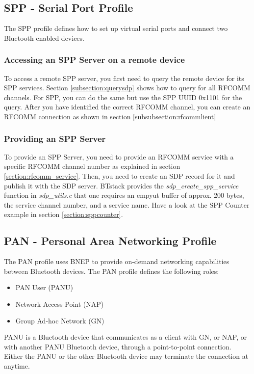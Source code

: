 \subsection{SPP - Serial Port Profile}
The SPP profile defines how to set up virtual serial ports and connect two Bluetooth enabled devices. 

\subsubsection{Accessing an SPP Server on a remote device}
To access a remote SPP server, you first need to query the remote device for its SPP services. Section \ref{subsection:querysdp} shows how to query for all RFCOMM channels. For SPP, you can do the same but use the SPP UUID 0x1101 for the query. After you have identified the correct RFCOMM channel, you can create an RFCOMM connection as shown in section \ref{subsubsection:rfcommlient}

\subsubsection{Providing an SPP Server}
To provide an SPP Server, you need to provide an RFCOMM service with a specific RFCOMM channel number as explained in section \ref{section:rfcomm_service}. Then, you need to create an SDP record for it and publish it with the SDP server. BTstack provides the \emph{sdp\_create\_spp\_service} function in \emph{sdp\_utils.c} that one requires an empyut buffer of approx. 200 bytes, the service channel number, and a service name. Have a look at the SPP Counter example in section \ref{section:sppcounter}.

\subsection{PAN -  Personal Area Networking Profile}
\label{section:pan_profile}
The PAN profile uses BNEP to provide on-demand networking capabilities between Bluetooth devices. The PAN profile defines the following roles:
\begin{itemize}
\item PAN User (PANU)
\item Network Access Point (NAP)
\item Group Ad-hoc Network (GN)
\end{itemize}

PANU is a Bluetooth device that communicates as a client with GN, or NAP, or with another PANU Bluetooth device, through a point-to-point connection. Either the PANU or the other Bluetooth device may terminate the connection at anytime.

